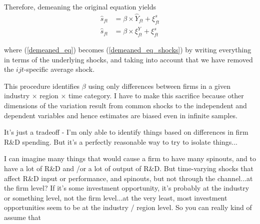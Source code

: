 \documentclass[12pt,english]{article}
\theoremstyle{remark}
\begin{document}
Therefore, demeaning the original equation yields
\begin{align}
	\hat{s}_{ft} &= \beta \times \hat{Y}_{ft} + \xi^s_{ft} \label{demeaned_eq} \\
	\hat{s}_{ft} &= \beta \times \xi^Y_{ft} + \xi^s_{ft}  \label{demeaned_eq_shocks}
\end{align}

where (\ref{demeaned_eq}) becomes (\ref{demeaned_eq_shocks}) by writing everything in terms of the underlying shocks, and taking into account that we have removed the $ijt$-specific average shock. 

This procedure identifies $\beta$ using only differences between firms in a given industry $\times$ region $\times$ time category. I have to make this sacrifice because other dimensions of the variation result from common shocks to the independent and dependent variables and hence estimates are biased even in infinite samples.

It's just a tradeoff - I'm only able to identify things based on differences in firm R\&D spending. But it's a perfectly reasonable way to try to isolate things...

I can imagine many things that would cause a firm to have many spinouts, and to have a lot of R\&D and /or a lot of output of R\&D. But time-varying shocks that affect R\&D input or performance, and spinouts, but not through the channel...at the firm level? If it's some investment opportunity, it's probably at the industry or something level, not the firm level...at the very least, most investment opportunities seem to be at the industry / region level. So you can really kind of assume that 
\end{document}
